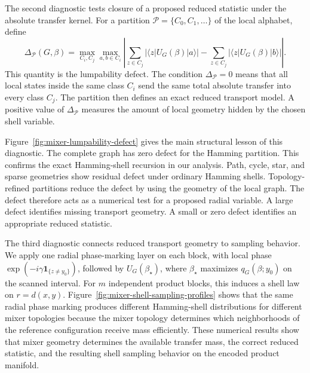 \documentclass[a4paper,onecolumn,11pt,unpublished]{quantumarticle}
\theoremstyle{remark}
\begin{document}
The second diagnostic tests closure of a proposed reduced statistic under the
absolute transfer kernel. For a partition
\(\mathcal P=\{C_0,C_1,\ldots\}\) of the local alphabet, define
\[
\Delta_{\mathcal P}(G,\beta)
=
\max_{C_i,C_j}
\max_{a,b\in C_i}
\left|
\sum_{z\in C_j}|\langle z|U_G(\beta)|a\rangle|
-
\sum_{z\in C_j}|\langle z|U_G(\beta)|b\rangle|
\right|.
\]
This quantity is the lumpability defect. The condition
\(\Delta_{\mathcal P}=0\) means that all local states inside the same class
\(C_i\) send the same total absolute transfer into every class \(C_j\). The
partition then defines an exact reduced transport model. A positive value of
\(\Delta_{\mathcal P}\) measures the amount of local geometry hidden by the
chosen shell variable.

Figure~\ref{fig:mixer-lumpability-defect} gives the main structural lesson of this diagnostic. The complete graph has zero defect for the Hamming partition. This confirms the exact Hamming-shell recursion in our analysis. Path, cycle, star, and sparse geometries show residual defect under ordinary Hamming shells. Topology-refined partitions reduce the defect by using the geometry of the local graph. The defect therefore acts as a numerical test for a proposed radial variable. A large defect identifies missing transport geometry. A small or zero defect identifies an appropriate reduced statistic.



The third diagnostic connects reduced transport geometry to sampling behavior.
We apply one radial phase-marking layer on each block, with local phase
\(\exp(-i\gamma \mathbf 1_{\{z\ne y_0\}})\), followed by
\(U_G(\beta_\star)\), where \(\beta_\star\) maximizes \(q_G(\beta;y_0)\) on the scanned interval. For \(m\) independent product blocks, this induces a shell law on \(r=d(x,y)\). Figure~\ref{fig:mixer-shell-sampling-profiles} shows that the same radial phase marking produces different Hamming-shell distributions for different mixer topologies because the mixer topology determines which neighborhoods of the reference configuration receive mass efficiently. These numerical results show that mixer geometry determines the available transfer mass, the correct reduced statistic, and the resulting shell sampling behavior on the encoded product manifold.
\end{document}
